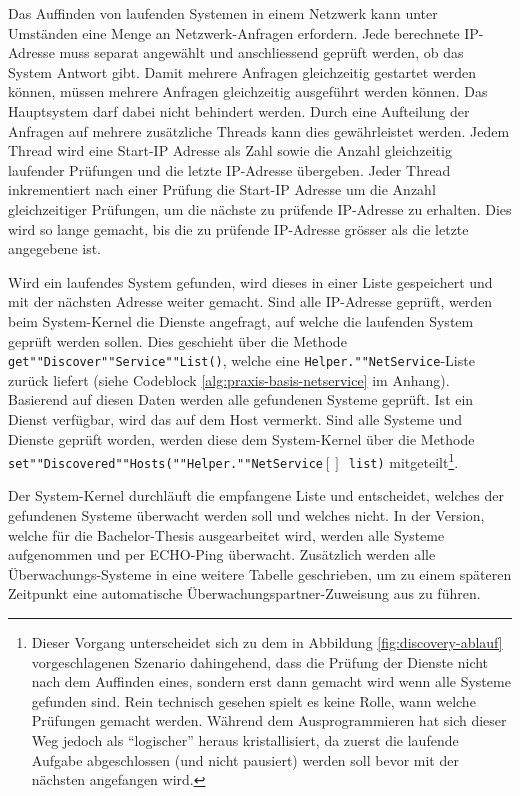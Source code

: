 Das Auffinden von laufenden Systemen in einem Netzwerk kann unter Umst\"anden eine Menge an Netzwerk-Anfragen erfordern. Jede berechnete IP-Adresse muss separat angew\"ahlt und anschliessend gepr\"uft werden, ob das System Antwort gibt. Damit mehrere Anfragen gleichzeitig gestartet werden k\"onnen, m\"ussen mehrere Anfragen gleichzeitig ausgef\"uhrt werden k\"onnen. Das Hauptsystem darf dabei nicht behindert werden. Durch eine Aufteilung der Anfragen auf mehrere zus\"atzliche Threads kann dies gew\"ahrleistet werden. Jedem Thread wird eine Start-IP Adresse als Zahl sowie die Anzahl gleichzeitig laufender Pr\"ufungen und die letzte IP-Adresse \"ubergeben. Jeder Thread inkrementiert nach einer Pr\"ufung die Start-IP Adresse um die Anzahl gleichzeitiger Pr\"ufungen, um die n\"achste zu pr\"ufende IP-Adresse zu erhalten. Dies wird so lange gemacht, bis die zu pr\"ufende IP-Adresse gr\"osser als die letzte angegebene ist.

Wird ein laufendes System gefunden, wird dieses in einer Liste gespeichert und mit der n\"achsten Adresse weiter gemacht. Sind alle IP-Adresse gepr\"uft, werden beim System-Kernel die Dienste angefragt, auf welche die laufenden System gepr\"uft werden sollen. Dies geschieht \"uber die Methode \texttt{get""Discover""Service""List()}, welche eine \texttt{Helper.""NetService}-Liste zur\"uck liefert (siehe Codeblock \ref{alg:praxis-basis-netservice} im Anhang). Basierend auf diesen Daten werden alle gefundenen Systeme gepr\"uft. Ist ein Dienst verf\"ugbar, wird das auf dem Host vermerkt. Sind alle Systeme und Dienste gepr\"uft worden, werden diese dem System-Kernel \"uber die Methode \texttt{set""Discovered""Hosts(""Helper.""NetService$\left[ \right]$ list)} mitgeteilt\footnote{Dieser Vorgang unterscheidet sich zu dem in Abbildung \ref{fig:discovery-ablauf} vorgeschlagenen Szenario dahingehend, dass die Pr\"ufung der Dienste nicht nach dem Auffinden eines, sondern erst dann gemacht wird wenn alle Systeme gefunden sind. Rein technisch gesehen spielt es keine Rolle, wann welche Pr\"ufungen gemacht werden. W\"ahrend dem Ausprogrammieren hat sich dieser Weg jedoch als "`logischer"' heraus kristallisiert, da zuerst die laufende Aufgabe abgeschlossen (und nicht pausiert) werden soll bevor mit der n\"achsten angefangen wird.}.

Der System-Kernel durchl\"auft die empfangene Liste und entscheidet, welches der gefundenen Systeme \"uberwacht werden soll und welches nicht. In der Version, welche f\"ur die Bachelor-Thesis ausgearbeitet wird, werden alle Systeme aufgenommen und per ECHO-Ping \"uberwacht. Zus\"atzlich werden alle \"Uberwachungs-Systeme in eine weitere Tabelle geschrieben, um zu einem sp\"ateren Zeitpunkt eine automatische \"Uberwachungspartner-Zuweisung aus zu f\"uhren.


